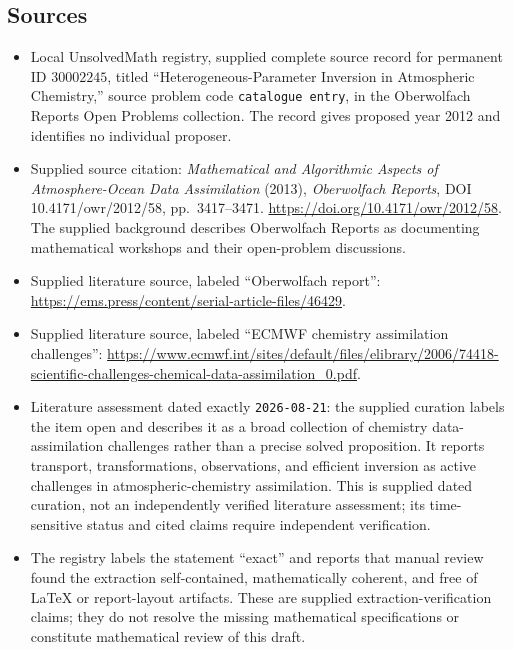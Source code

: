 \documentclass[11pt]{article}
\begin{document}
\subsection{Sources}
\begin{itemize}
\item Local UnsolvedMath registry, supplied complete source record for permanent ID \(30002245\), titled ``Heterogeneous-Parameter Inversion in Atmospheric Chemistry,'' source problem code \texttt{catalogue entry}, in the Oberwolfach Reports Open Problems collection. The record gives proposed year 2012 and identifies no individual proposer.
\item Supplied source citation: \emph{Mathematical and Algorithmic Aspects of Atmosphere-Ocean Data Assimilation} (2013), \emph{Oberwolfach Reports}, DOI 10.4171/owr/2012/58, pp.\ 3417--3471. \url{https://doi.org/10.4171/owr/2012/58}. The supplied background describes Oberwolfach Reports as documenting mathematical workshops and their open-problem discussions.
\item Supplied literature source, labeled ``Oberwolfach report'': \url{https://ems.press/content/serial-article-files/46429}.
\item Supplied literature source, labeled ``ECMWF chemistry assimilation challenges'': \url{https://www.ecmwf.int/sites/default/files/elibrary/2006/74418-scientific-challenges-chemical-data-assimilation_0.pdf}.
\item Literature assessment dated exactly \texttt{2026-08-21}: the supplied curation labels the item open and describes it as a broad collection of chemistry data-assimilation challenges rather than a precise solved proposition. It reports transport, transformations, observations, and efficient inversion as active challenges in atmospheric-chemistry assimilation. This is supplied dated curation, not an independently verified literature assessment; its time-sensitive status and cited claims require independent verification.
\item The registry labels the statement ``exact'' and reports that manual review found the extraction self-contained, mathematically coherent, and free of LaTeX or report-layout artifacts. These are supplied extraction-verification claims; they do not resolve the missing mathematical specifications or constitute mathematical review of this draft.
\end{itemize}
\end{document}

